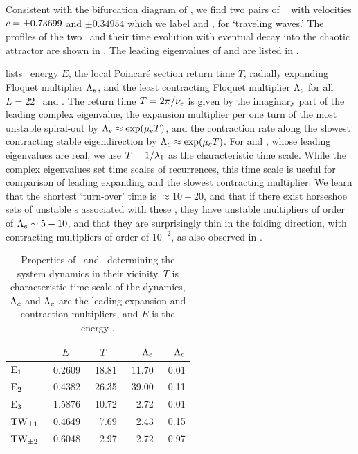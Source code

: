 Consistent with the bifurcation diagram of ,
we find two pairs of \reqva\  with velocities
$\velRel =\pm 0.73699$ and $\pm 0.34954$
which we label  and ,
for `traveling waves.'
The profiles of the two \reqva\ and their time evolution
with eventual decay into the chaotic attractor are
shown in .  The leading eigenvalues of
 and  are listed in .

 lists \eqv\ energy $E$,
the local Poincar\'e section return time $T$,
radially expanding Floquet multiplier $\ExpaEig_e$, and
the least contracting Floquet multiplier $\ExpaEig_c$
for all $L=22$ \eqva\ and \reqva.
The return time $T=2\pi/\eigIm[e]$ is given by the imaginary
part of the leading complex eigenvalue,
the expansion
multiplier per one turn of the most unstable spiral-out by
$\ExpaEig_e\approx\exp(\eigRe[e] T)$, and the contraction
rate along the slowest contracting stable eigendirection by
$\ExpaEig_c\approx\exp(\eigRe[c]T)$.
For  and , whose leading eigenvalues are
real, we use $T=1/\Lyap_1$ as the characteristic time scale.
While the complex eigenvalues set time scales of recurrences,
this time scale is useful for comparison of leading expanding
and the slowest contracting multiplier.
We learn that the shortest
`turn-over' time is $\approx 10-20$, and that if there exist
horseshoe sets of unstable \po s associated with
these \eqva,  they have unstable
multipliers of order of $\ExpaEig_e \sim 5-10$, and that
they are surprisingly thin in the folding direction, with
contracting multipliers of order of $10^{-2}$,
as also observed in .

\begin{table}[ht]
    \caption{
    Properties of \eqva\ and \reqva\ determining
    the system dynamics in their vicinity.  $T$ is characteristic
    time scale of the dynamics, $\ExpaEig_e$ and $\ExpaEig_c$ are the
    leading expansion and contraction multipliers, and $E$ is the
    energy .
            }
\begin{center} \footnotesize
    \begin{tabular}{l|rrrr}
                 & $E$~~   & $T$~~  & $\ExpaEig_e$  & $\ExpaEig_c$  \\ \hline
 $\EQV{1}\ $     &\ 0.2609 &\ 18.81 &\ 11.70    &\ 0.01 \\ %
 $\EQV{2}\ $     &\ 0.4382 &\ 26.35 &\ 39.00    &\ 0.11 \\ %
 $\EQV{3}\ $     &\ 1.5876 &\ 10.72 &\ 2.72     &\ 0.01 \\ %
 $\REQV{\pm}{1}$ &\ 0.4649 &\  7.69 &\ 2.43     &\ 0.15 \\
 $\REQV{\pm}{2}$ &\ 0.6048 &\  2.97 &\ 2.72     &\ 0.97 \\ %
    \end{tabular}
\end{center}
\label{tab:L22cminus}
\end{table}

